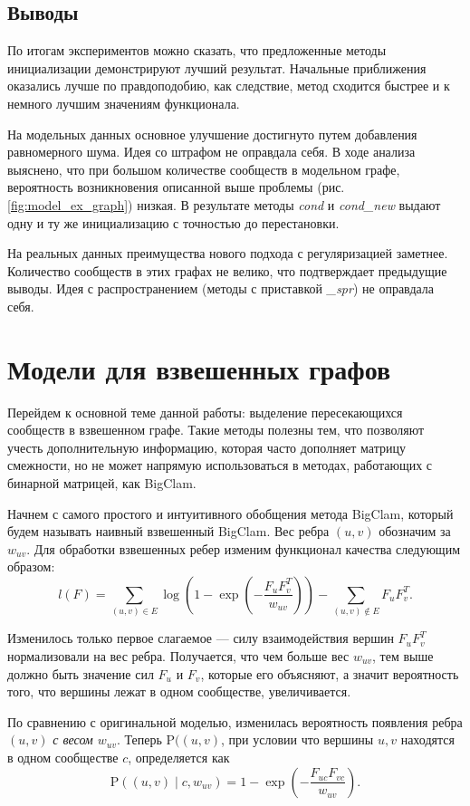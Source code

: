 \documentclass{ITaSconf}
\def\PP{\mathrm{P}}
\begin{document}
	\subsection{Выводы} 
	По итогам экспериментов можно сказать, что предложенные методы инициализации демонстрируют лучший результат. 
	Начальные приближения оказались лучше по правдоподобию, как следствие, метод сходится быстрее и к немного лучшим значениям функционала. 
	
	На модельных данных основное улучшение достигнуто путем добавления равномерного шума. Идея со штрафом не оправдала себя. В ходе анализа выяснено, что при большом количестве сообществ в модельном графе, вероятность возникновения описанной выше проблемы (рис. \ref{fig:model_ex_graph}) низкая. В результате методы \textit{cond} и \textit{cond\_new} выдают одну и ту же инициализацию с точностью до перестановки.
	
	На реальных данных преимущества нового подхода с регуляризацией заметнее. Количество сообществ в этих графах не велико, что подтверждает предыдущие выводы. 
	Идея с распространением (методы с приставкой \textit{\_spr}) не оправдала себя.
	
	\section{Модели для взвешенных графов}
	
	Перейдем к основной теме данной работы: выделение пересекающихся сообществ в взвешенном графе. 
	Такие методы полезны тем, что позволяют учесть дополнительную информацию, которая часто дополняет матрицу смежности, но не может напрямую использоваться в методах, работающих с бинарной матрицей, как BigClam.
	
	Начнем с самого простого и интуитивного обобщения метода BigClam, который будем называть наивный взвешенный BigClam.
	Вес ребра $(u,v)$ обозначим за $w_{uv}$. 
	Для обработки взвешенных ребер изменим функционал качества следующим образом:
	$$l(F) = \sum_{(u,v)\in E} \log\left(1 - \exp\left( - \dfrac{F_{u} F_{v}^T}{w_{uv}}\right)\right) - \sum_{(u,v) \notin E} F_{u} F_{v}^T.$$
	
	Изменилось только первое слагаемое --- силу взаимодействия вершин $F_u F_v^T$ нормализовали на вес ребра.
	Получается, что чем больше вес $w_{uv}$, тем выше должно быть значение сил $F_u$ и $F_v$, которые его объясняют, а значит вероятность того, что вершины лежат в одном сообществе, увеличивается.
	
	По сравнению с оригинальной моделью, изменилась вероятность появления ребра $(u,v)$ \textit{с весом $w_{uv}$}. Теперь $\PP((u,v)$, при условии что вершины $u,v$ находятся в одном сообществе $c$, определяется как
	$$\PP((u,v) \mid c, w_{uv})=1 - \exp\left(-\dfrac{F_{uc} F_{vc}}{w_{uv}}\right).$$
	
\end{document}
